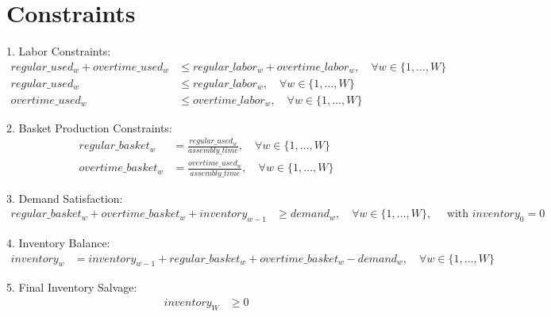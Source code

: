 \documentclass{article}
\begin{document}
\section*{Constraints}
1. Labor Constraints:
\begin{align*}
    regular\_used_{w} + overtime\_used_{w} & \leq regular\_labor_{w} + overtime\_labor_{w}, \quad \forall w \in \{1, \ldots, W\} \\
    regular\_used_{w} & \leq regular\_labor_{w}, \quad \forall w \in \{1, \ldots, W\} \\
    overtime\_used_{w} & \leq overtime\_labor_{w}, \quad \forall w \in \{1, \ldots, W\}
\end{align*}

2. Basket Production Constraints:
\begin{align*}
    regular\_basket_{w} & = \frac{regular\_used_{w}}{assembly\_time}, \quad \forall w \in \{1, \ldots, W\} \\
    overtime\_basket_{w} & = \frac{overtime\_used_{w}}{assembly\_time}, \quad \forall w \in \{1, \ldots, W\}
\end{align*}

3. Demand Satisfaction:
\begin{align*}
    regular\_basket_{w} + overtime\_basket_{w} + inventory_{w-1} & \geq demand_{w}, \quad \forall w \in \{1, \ldots, W\}, \quad \text{ with } inventory_{0} = 0
\end{align*}

4. Inventory Balance:
\begin{align*}
    inventory_{w} & = inventory_{w-1} + regular\_basket_{w} + overtime\_basket_{w} - demand_{w}, \quad \forall w \in \{1, \ldots, W\}
\end{align*}

5. Final Inventory Salvage:
\begin{align*}
    inventory_{W} & \geq 0
\end{align*}
\end{document}
